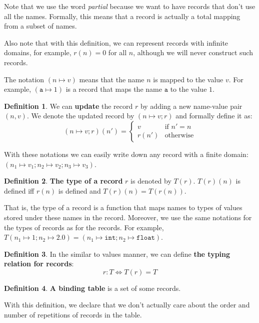 \documentclass[14pt]{constructor-thesis}
\theoremstyle{definition}
\newtheorem{definition}{Definition}
\begin{document}
Note that we use the word \textit{partial} because we want to have records that don't use all the names. Formally, this means that a record is actually a total mapping from a subset of names.

Also note that with this definition, we can represent records with infinite domains, for example, $r(n) = 0$ for all $n$, although we will never construct such records.

The notation $(n \mapsto v)$ means that the name $n$ is mapped to the value $v$. For example, $(\mathtt{a} \mapsto 1)$ is a record that maps the name $\mathtt{a}$ to the value $1$.

\begin{definition}
  We can \textbf{update} the record $r$ by adding a new name-value pair $(n, v)$. We denote the updated record by $(n \mapsto v; r)$ and formally define it as:
  $$
  (n \mapsto v; r)(n') = \begin{cases}
    v & \text{if } n' = n \\
    r(n') & \text{otherwise}
  \end{cases}
  $$
\end{definition}

With these notations we can easily write down any record with a finite domain: $(n_1 \mapsto v_1; n_2 \mapsto v_2; n_3 \mapsto v_3)$.

\begin{definition}
  \textbf{The type of a record} $r$ is denoted by $T(r)$. $T(r)(n)$ is defined iff $r(n)$ is defined and $T(r)(n) = T(r(n))$.
\end{definition}

That is, the type of a record is a function that maps names to types of values stored under these names in the record. Moreover, we use the same notations for the types of records as for the records. For example, $T(n_1 \mapsto 1; n_2 \mapsto 2.0) = (n_1 \mapsto \mathtt{int}; n_2 \mapsto \mathtt{float})$.

\begin{definition}
  In the similar to values manner, we can define \textbf{the typing relation for records}:
  $$ r : T \Longleftrightarrow T(r) = T $$
\end{definition}

\begin{definition}
  \textbf{A binding table} is a set of some records.
\end{definition}

With this definition, we declare that we don't actually care about the order and number of repetitions of records in the table.
\end{document}
